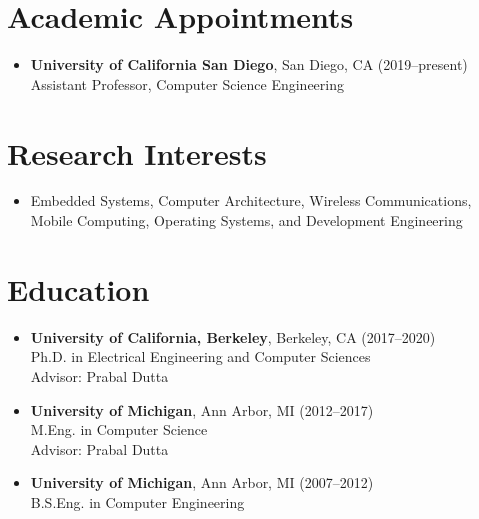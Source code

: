 \documentclass{article}
\begin{document}
%
%
%


\section*{Academic Appointments}

\begin{itemize}
  \item[]
    \textbf{University of California San Diego}, San Diego, CA (2019--present) \\
    Assistant Professor, Computer Science Engineering
\end{itemize}

\section*{Research Interests}
\begin{itemize}
  \item[] Embedded Systems, Computer Architecture, Wireless Communications, Mobile Computing, Operating Systems, and Development Engineering
\end{itemize}

\section*{Education}

\begin{itemize}
  \item[]
    \textbf{University of California, Berkeley}, Berkeley, CA (2017--2020) \\
    Ph.D. in Electrical Engineering and Computer Sciences \\
    Advisor: Prabal Dutta

  \item[]
    \textbf{University of Michigan}, Ann Arbor, MI (2012--2017) \\
    M.Eng. in Computer Science \\
    Advisor: Prabal Dutta

  \item[]
    \textbf{University of Michigan}, Ann Arbor, MI (2007--2012) \\
    B.S.Eng. in Computer Engineering
\end{itemize}
\end{document}
